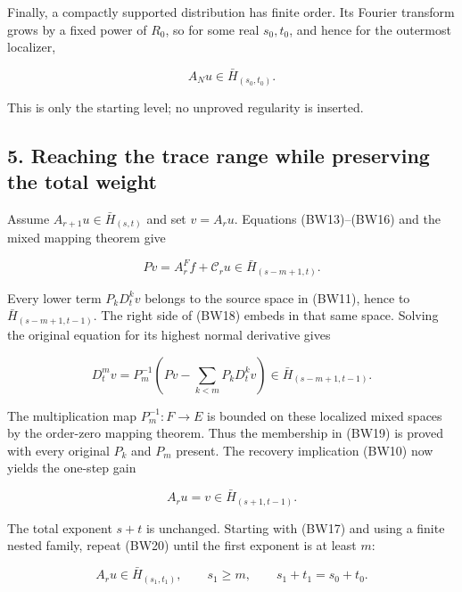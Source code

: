 \documentclass[
  11pt,
]{article}
\makeatletter
\let\ReaderOriginalAnchorStart\hyper@anchorstart
\let\ReaderOriginalAnchorEnd\hyper@anchorend
\let\ReaderPendingAliases\@empty
\def\ReaderArmAliases#1{\gdef\ReaderPendingAliases{#1}}
\def\hyper@anchorstart#1{\ReaderIfNativeAnchorTF{#1}{\ReaderPendingAliases\global\let\ReaderPendingAliases\@empty}{}\ReaderOriginalAnchorStart{#1}}
\makeatother
\begin{document}
Finally, a compactly supported distribution has finite order. Its
Fourier transform grows by a fixed power of \(R_0\), so for some real
\(s_0,t_0\), and hence for the outermost localizer,

\[
 A_Nu\in\bar H_{(s_0,t_0)}.
 \tag{BW17}
\]

This is only the starting level; no unproved regularity is inserted.

\ReaderArmAliases{\ReaderOriginalAnchorStart{AN03-BWF-005}\ReaderOriginalAnchorEnd\begingroup\expandafter\def\csname @currentHref\endcsname{AN03-BWF-005}\label{AN03-BWF-005}\endgroup\ReaderOriginalAnchorStart{5-reaching-the-trace-range-while-preserving-the-total-weight}\ReaderOriginalAnchorEnd\begingroup\expandafter\def\csname @currentHref\endcsname{5-reaching-the-trace-range-while-preserving-the-total-weight}\label{5-reaching-the-trace-range-while-preserving-the-total-weight}\endgroup}
\subsection{5. Reaching the trace range while preserving the total
weight}\label{reaching-the-trace-range-while-preserving-the-total-weight}

Assume \(A_{r+1}u\in\bar H_{(s,t)}\) and set \(v=A_ru\). Equations
(BW13)--(BW16) and the mixed mapping theorem give

\[
 Pv=A_r^Ff+\mathcal C_ru\in\bar H_{(s-m+1,t)}.
 \tag{BW18}
\]

Every lower term \(P_kD_t^kv\) belongs to the source space in (BW11),
hence to \(\bar H_{(s-m+1,t-1)}\). The right side of (BW18) embeds in
that same space. Solving the original equation for its highest normal
derivative gives

\[
 D_t^mv=P_m^{-1}\left(Pv-\sum_{k<m}P_kD_t^kv\right)
 \in\bar H_{(s-m+1,t-1)}.
 \tag{BW19}
\]

The multiplication map \(P_m^{-1}:F\to E\) is bounded on these localized
mixed spaces by the order-zero mapping theorem. Thus the membership in
(BW19) is proved with every original \(P_k\) and \(P_m\) present. The
recovery implication (BW10) now yields the one-step gain

\[
 A_ru=v\in\bar H_{(s+1,t-1)}.
 \tag{BW20}
\]

The total exponent \(s+t\) is unchanged. Starting with (BW17) and using
a finite nested family, repeat (BW20) until the first exponent is at
least \(m\):

\[
 A_ru\in\bar H_{(s_1,t_1)},\qquad s_1\geq m,
 \qquad s_1+t_1=s_0+t_0.
 \tag{BW21}
\]
\end{document}
